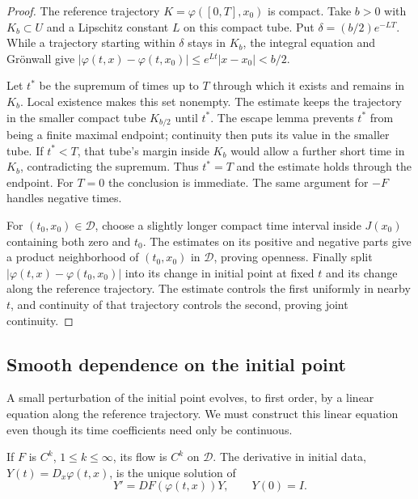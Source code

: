 \begin{proof}
The reference trajectory $K=\varphi([0,T],x_0)$ is compact. Take $b>0$ with $K_b\subset U$ and a Lipschitz constant $L$ on this compact tube. Put $\delta=(b/2)e^{-LT}$. While a trajectory starting within $\delta$ stays in $K_b$, the integral equation and Gr\"onwall give
$|\varphi(t,x)-\varphi(t,x_0)|\le e^{Lt}|x-x_0|<b/2$.

Let $t^*$ be the supremum of times up to $T$ through which it exists and remains in $K_b$. Local existence makes this set nonempty. The estimate keeps the trajectory in the smaller compact tube $K_{b/2}$ until $t^*$. The escape lemma prevents $t^*$ from being a finite maximal endpoint; continuity then puts its value in the smaller tube. If $t^*<T$, that tube's margin inside $K_b$ would allow a further short time in $K_b$, contradicting the supremum. Thus $t^*=T$ and the estimate holds through the endpoint. For $T=0$ the conclusion is immediate. The same argument for $-F$ handles negative times.

For $(t_0,x_0)\in\mathcal D$, choose a slightly longer compact time interval inside $J(x_0)$ containing both zero and $t_0$. The estimates on its positive and negative parts give a product neighborhood of $(t_0,x_0)$ in $\mathcal D$, proving openness. Finally split
$|\varphi(t,x)-\varphi(t_0,x_0)|$ into its change in initial point at fixed $t$ and its change along the reference trajectory. The estimate controls the first uniformly in nearby $t$, and continuity of that trajectory controls the second, proving joint continuity.
\end{proof}

\subsection*{Smooth dependence on the initial point}

A small perturbation of the initial point evolves, to first order, by a linear equation along the reference trajectory. We must construct this linear equation even though its time coefficients need only be continuous.

\begin{theorem}\label{thm:flowsmooth}
If $F$ is $C^k$, $1\le k\le\infty$, its flow is $C^k$ on $\mathcal D$. The derivative in initial data, $Y(t)=D_x\varphi(t,x)$, is the unique solution of
\[
Y'=DF(\varphi(t,x))Y,\qquad Y(0)=I.
\]
\end{theorem}

